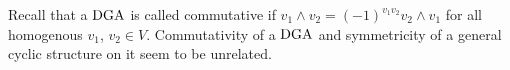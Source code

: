 \documentclass[\MainFolder/Text.tex]{subfiles}
\begin{document}
Recall that a $\mathrm{DGA}$ is called commutative if $v_1 \wedge v_2 = (-1)^{v_1 v_2} v_2\wedge v_1$ for all homogenous $v_1$, $v_2\in V$. Commutativity of a $\mathrm{DGA}$ and symmetricity of a general cyclic structure on it seem to be unrelated.

%
\end{document}
